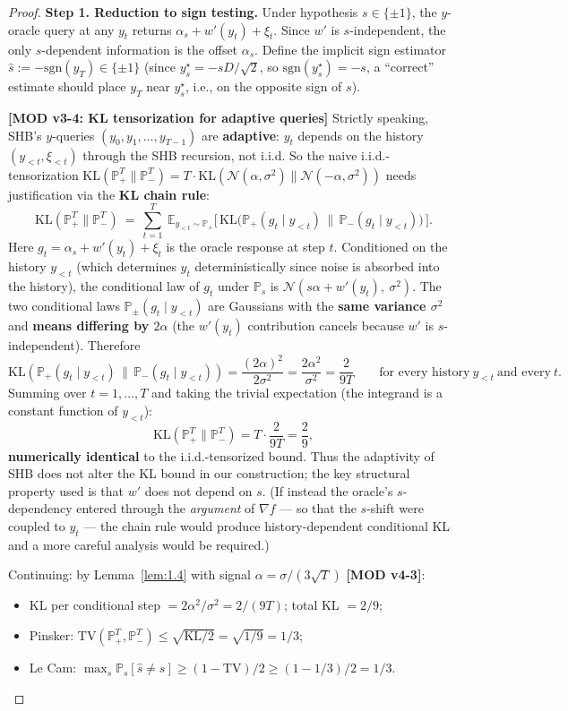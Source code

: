 \documentclass[11pt,a4paper]{article}
\theoremstyle{plain}
\theoremstyle{definition}
\theoremstyle{remark}
\newcommand{\E}{\mathbb{E}}
\newcommand{\Prb}{\mathbb{P}}
\newcommand{\KL}{\mathrm{KL}}
\newcommand{\TV}{\mathrm{TV}}
\begin{document}
\begin{proof}
\textbf{Step 1. Reduction to sign testing.} Under hypothesis $s \in \{\pm 1\}$, the $y$-oracle query at any $y_t$ returns $\alpha_s + w'(y_t) + \xi_t$. Since $w'$ is $s$-independent, the only $s$-dependent information is the offset $\alpha_s$. Define the implicit sign estimator $\hat s := -\mathrm{sgn}(y_T) \in \{\pm 1\}$ (since $y^\star_s = -sD/\sqrt 2$, so $\mathrm{sgn}(y^\star_s) = -s$, a ``correct'' estimate should place $y_T$ near $y^\star_s$, i.e., on the opposite sign of $s$).

\textbf{[MOD v3-4: KL tensorization for adaptive queries]} Strictly speaking, SHB's $y$-queries $(y_0, y_1, \ldots, y_{T-1})$ are \textbf{adaptive}: $y_t$ depends on the history $(y_{<t}, \xi_{<t})$ through the SHB recursion, not i.i.d. So the naive i.i.d.-tensorization $\KL(\Prb_+^T \| \Prb_-^T) = T \cdot \KL(\mathcal{N}(\alpha,\sigma^2) \| \mathcal{N}(-\alpha, \sigma^2))$ needs justification via the \textbf{KL chain rule}:
\[
\KL(\Prb_+^T \| \Prb_-^T) \ =\ \sum_{t=1}^T\ \E_{y_{<t} \sim \Prb_+}\bigl[\,\KL\bigl(\Prb_+(g_t \mid y_{<t})\,\|\,\Prb_-(g_t \mid y_{<t})\bigr)\,\bigr].
\]
Here $g_t = \alpha_s + w'(y_t) + \xi_t$ is the oracle response at step $t$. Conditioned on the history $y_{<t}$ (which determines $y_t$ deterministically since noise is absorbed into the history), the conditional law of $g_t$ under $\Prb_s$ is $\mathcal{N}(s\alpha + w'(y_t),\ \sigma^2)$. The two conditional laws $\Prb_\pm(g_t \mid y_{<t})$ are Gaussians with the \textbf{same variance $\sigma^2$} and \textbf{means differing by $2\alpha$} (the $w'(y_t)$ contribution cancels because $w'$ is $s$-independent). Therefore
\[
\KL(\Prb_+(g_t \mid y_{<t})\,\|\,\Prb_-(g_t \mid y_{<t})) = \frac{(2\alpha)^2}{2\sigma^2} = \frac{2\alpha^2}{\sigma^2} = \frac{2}{9T}\qquad\text{for every history}\ y_{<t}\ \text{and every}\ t.
\]
Summing over $t = 1, \ldots, T$ and taking the trivial expectation (the integrand is a constant function of $y_{<t}$):
\[
\KL(\Prb_+^T \| \Prb_-^T) = T \cdot \frac{2}{9T} = \frac{2}{9},
\]
\textbf{numerically identical} to the i.i.d.-tensorized bound. Thus the adaptivity of SHB does not alter the KL bound in our construction; the key structural property used is that $w'$ does not depend on $s$. (If instead the oracle's $s$-dependency entered through the \emph{argument} of $\nabla f$ --- so that the $s$-shift were coupled to $y_t$ --- the chain rule would produce history-dependent conditional KL and a more careful analysis would be required.)

Continuing: by Lemma~\ref{lem:1.4} with signal $\alpha = \sigma/(3\sqrt T)$ \textbf{[MOD v4-3]}:
\begin{itemize}
\item KL per conditional step $= 2\alpha^2/\sigma^2 = 2/(9T)$; total KL $= 2/9$;
\item Pinsker: $\TV(\Prb_+^T, \Prb_-^T) \leq \sqrt{\KL/2} = \sqrt{1/9} = 1/3$;
\item Le Cam: $\max_s \Prb_s[\hat s \neq s] \geq (1 - \TV)/2 \geq (1 - 1/3)/2 = 1/3$.
\end{itemize}


\end{proof}
\end{document}

